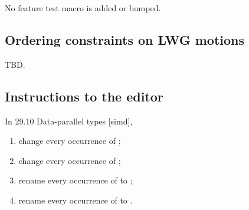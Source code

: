 No feature test macro is added or bumped.

\subsection{Ordering constraints on LWG motions}

TBD.

\subsection{Instructions to the editor}

In 29.10 Data-parallel types [simd],

\begin{enumerate}
  \item change every occurrence of ;
  \item change every occurrence of ;
  \item rename every occurrence of  to ;
  \item rename every occurrence of  to .
\end{enumerate}


